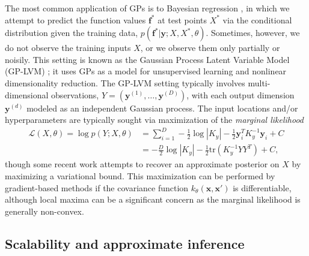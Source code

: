 \documentclass{article}
\newcommand{\tr}{\text{tr}}
\renewcommand{\v}[1]{\mathbf{#1}}
\begin{document}
The most common application of GPs is to Bayesian regression
\cite{rasmussen2006}, in which we attempt to predict the
function values $\v{f}^*$ at test points $X^*$ via the conditional
distribution given the training
data, $p(\v{f}^* | \v{y}; X, X^*, \theta)$. Sometimes, however, we do not observe the training inputs $X$,
or we observe them only partially or noisily. This setting is known as the Gaussian Process
Latent Variable Model (GP-LVM)  \cite{lawrence2004gaussian}; it uses
GPs as a model for unsupervised
  learning and nonlinear dimensionality reduction. The GP-LVM
  setting typically involves multi-dimensional observations, $Y = (\v{y}^{(1)}, \ldots,
  \v{y}^{(D)})$, with each output dimension $\v{y}^{(d)}$ modeled as an
  independent Gaussian process. The input locations and/or hyperparameters are typically sought via maximization of the {\em marginal likelihood}
\begin{align}
\mathcal{L}(X, \theta) = \log p(Y ; X, \theta) &= \sum_{i=1}^D -\frac{1}{2}\log |K_y| - \frac{1}{2} \v{y}_i^T K_y^{-1} \v{y}_i + C\nonumber\\
&= -\frac{D}{2}\log |K_y| - \frac{1}{2}\tr(K_y^{-1} YY^T) + C,\label{eqn:mlik}
\end{align}
though some recent work \citep{titsias2010bayesian,
  damianou2014} attempts to recover an
approximate posterior on $X$ by maximizing a variational bound. This
maximization can be performed by gradient-based methods if the
covariance function $k_\theta(\v{x}, \v{x}')$ is differentiable,
although local maxima can be a significant concern as
the marginal likelihood is generally non-convex.

\subsection{Scalability and approximate inference}
\label{sec:approx}
\end{document}
